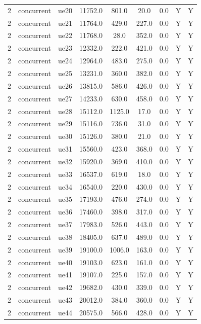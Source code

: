 \begin{table}[ht]
\begin{tabular}{|c|c|c|c|c|c|c|c|c|}
2 & concurrent & ue20 & 11752.0 & 801.0 & 20.0 & 0.0 & Y & Y \\
2 & concurrent & ue21 & 11764.0 & 429.0 & 227.0 & 0.0 & Y & Y \\
2 & concurrent & ue22 & 11768.0 & 28.0 & 352.0 & 0.0 & Y & Y \\
2 & concurrent & ue23 & 12332.0 & 222.0 & 421.0 & 0.0 & Y & Y \\
2 & concurrent & ue24 & 12964.0 & 483.0 & 275.0 & 0.0 & Y & Y \\
2 & concurrent & ue25 & 13231.0 & 360.0 & 382.0 & 0.0 & Y & Y \\
2 & concurrent & ue26 & 13815.0 & 586.0 & 426.0 & 0.0 & Y & Y \\
2 & concurrent & ue27 & 14233.0 & 630.0 & 458.0 & 0.0 & Y & Y \\
2 & concurrent & ue28 & 15112.0 & 1125.0 & 17.0 & 0.0 & Y & Y \\
2 & concurrent & ue29 & 15116.0 & 736.0 & 31.0 & 0.0 & Y & Y \\
2 & concurrent & ue30 & 15126.0 & 380.0 & 21.0 & 0.0 & Y & Y \\
2 & concurrent & ue31 & 15560.0 & 423.0 & 368.0 & 0.0 & Y & Y \\
2 & concurrent & ue32 & 15920.0 & 369.0 & 410.0 & 0.0 & Y & Y \\
2 & concurrent & ue33 & 16537.0 & 619.0 & 18.0 & 0.0 & Y & Y \\
2 & concurrent & ue34 & 16540.0 & 220.0 & 430.0 & 0.0 & Y & Y \\
2 & concurrent & ue35 & 17193.0 & 476.0 & 274.0 & 0.0 & Y & Y \\
2 & concurrent & ue36 & 17460.0 & 398.0 & 317.0 & 0.0 & Y & Y \\
2 & concurrent & ue37 & 17983.0 & 526.0 & 443.0 & 0.0 & Y & Y \\
2 & concurrent & ue38 & 18405.0 & 637.0 & 489.0 & 0.0 & Y & Y \\
2 & concurrent & ue39 & 19100.0 & 1006.0 & 163.0 & 0.0 & Y & Y \\
2 & concurrent & ue40 & 19103.0 & 623.0 & 161.0 & 0.0 & Y & Y \\
2 & concurrent & ue41 & 19107.0 & 225.0 & 157.0 & 0.0 & Y & Y \\
2 & concurrent & ue42 & 19682.0 & 430.0 & 339.0 & 0.0 & Y & Y \\
2 & concurrent & ue43 & 20012.0 & 384.0 & 360.0 & 0.0 & Y & Y \\
2 & concurrent & ue44 & 20575.0 & 566.0 & 428.0 & 0.0 & Y & Y \\

\end{tabular}
\end{table}
